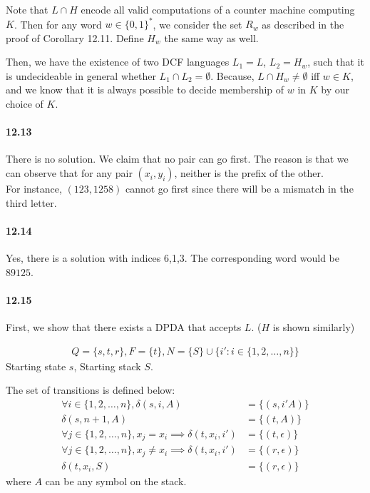 \documentclass{article}
\begin{document}
Note that $L\cap H$ encode all valid computations of a counter machine computing $K$. Then for any word $w\in \{0,1\}^*$, we consider the set $R_w$ as described in the proof of Corollary 12.11. Define $H_w$ the same way as well.

Then, we have the existence of two DCF languages $L_1=L$, $L_2=H_w$, such that it is undecideable in general whether $L_1\cap L_2 = \emptyset$. Because, $L\cap H_w\neq \emptyset$ iff $w\in K$, and we know that it is always possible to decide membership of $w$ in $K$ by our choice of $K$.

\paragraph{12.13} There is no solution. We claim that no pair can go first. The reason is that we can observe that for any pair $(x_i, y_i)$, neither is the prefix of the other.\\
For instance, $(123,1258)$ cannot go first since there will be a mismatch in the third letter.

\paragraph{12.14} Yes, there is a solution with indices 6,1,3. The corresponding word would be $89125$.

\paragraph{12.15} First, we show that there exists a DPDA that accepts $L$. ($H$ is shown similarly)

\begin{align*}
	Q=\{s,t,r\}, F=\{t\}, N=\{S\}\cup \{i' : i\in \{1,2,\dots, n\}\}
\end{align*}
Starting state $s$, Starting stack $S$.

The set of transitions is defined below:
\begin{align*}
	\forall i\in \{1,2,\dots, n\}, \delta(s, i, A) &= \{(s,i'A)\}\\
	\delta(s,n+1,A) &= \{(t,A)\}\\
	\forall j\in \{1,2,\dots, n\}, x_j=x_i\implies \delta(t,x_i,i') &= \{(t,\epsilon)\}\\
	\forall j\in \{1,2,\dots, n\}, x_j\neq x_i\implies \delta(t,x_i,i') &= \{(r,\epsilon)\}\\
	\delta(t,x_i,S) &= \{(r,\epsilon)\}
\end{align*}
where $A$ can be any symbol on the stack.
\end{document}
